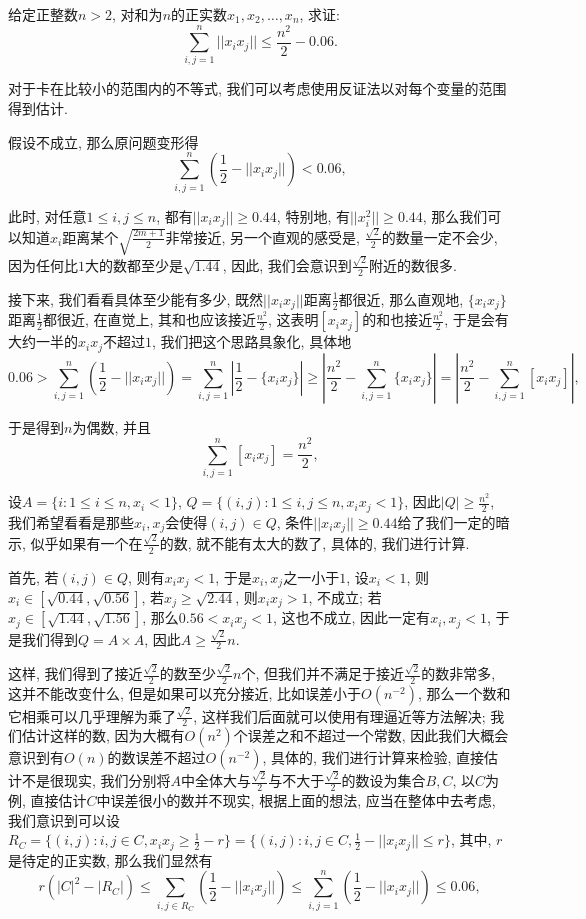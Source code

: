 \documentclass[lang=cn,12pt,thmcnt=section]{elegantbook}
\begin{document}
\begin{example}
给定正整数$n>2$, 对和为$n$的正实数$x_1,x_2,\dots{},x_n$, 求证: 
\[
\sum_{i,j=1}^n ||x_ix_j||\le \frac{n^2}{2}-0.06.
\]
\end{example}

\begin{analysis}
对于卡在比较小的范围内的不等式, 我们可以考虑使用反证法以对每个变量的范围得到估计.

假设不成立, 那么原问题变形得
\[
\sum_{i,j=1}^n \left(\frac{1}{2}-||x_ix_j||\right)<0.06,
\]

此时, 对任意$1\le i,j\le n$, 都有$||x_ix_j||\ge 0.44$, 特别地, 有$||x_i^2||\ge 0.44$, 那么我们可以知道$x_i$距离某个$\sqrt{\frac{2m+1}{2}}$非常接近, 另一个直观的感受是, $\frac{\sqrt{2}}{2}$的数量一定不会少, 因为任何比$1$大的数都至少是$\sqrt{1.44}$, 因此, 我们会意识到$\frac{\sqrt{2}}{2}$附近的数很多. 

接下来, 我们看看具体至少能有多少, 既然$||x_ix_j||$距离$\frac{1}{2}$都很近, 那么直观地, $\{x_ix_j\}$距离$\frac{1}{2}$都很近, 在直觉上, 其和也应该接近$\frac{n^2}{2}$, 这表明$[x_ix_j]$的和也接近$\frac{n^2}{2}$, 于是会有大约一半的$x_ix_j$不超过$1$, 我们把这个思路具象化, 具体地
\[
0.06>\sum_{i,j=1}^n \left(\frac{1}{2}-||x_ix_j||\right)=\sum_{i,j=1}^n \left|\frac{1}{2}-\{x_ix_j\}\right|\ge \left|\frac{n^2}{2}-\sum_{i,j=1}^n\{x_ix_j\}\right|=\left|\frac{n^2}{2}-\sum_{i,j=1}^n[x_ix_j]\right|,
\]

于是得到$n$为偶数, 并且
\[
\sum_{i,j=1}^n[x_ix_j]=\frac{n^2}{2},
\]

设$A=\{i:1\le i\le n,x_i<1\}$, $Q=\{(i,j):1\le i,j\le n,x_ix_j<1\}$, 因此$|Q|\ge \frac{n^2}{2}$, 我们希望看看是那些$x_i,x_j$会使得$(i,j)\in Q$, 条件$||x_ix_j||\ge 0.44$给了我们一定的暗示, 似乎如果有一个在$\frac{\sqrt{2}}{2}$的数, 就不能有太大的数了, 具体的, 我们进行计算. 

首先, 若$(i,j)\in Q$, 则有$x_ix_j< 1$, 于是$x_i,x_j$之一小于$1$, 设$x_i<1$, 则$x_i\in [\sqrt{0.44},\sqrt{0.56}]$, 若$x_j\ge \sqrt{2.44}$, 则$x_ix_j>1$, 不成立; 若$x_j\in [\sqrt{1.44},\sqrt{1.56}]$, 那么$0.56<x_ix_j<1$, 这也不成立, 因此一定有$x_i,x_j<1$, 于是我们得到$Q=A\times A$, 因此$A\ge \frac{\sqrt{2}}{2}n$.

这样, 我们得到了接近$\frac{\sqrt{2}}{2}$的数至少$\frac{\sqrt{2}}{2}n$个, 但我们并不满足于接近$\frac{\sqrt{2}}{2}$的数非常多, 这并不能改变什么, 但是如果可以充分接近, 比如误差小于$O(n^{-2})$, 那么一个数和它相乘可以几乎理解为乘了$\frac{\sqrt{2}}{2}$, 这样我们后面就可以使用有理逼近等方法解决; 我们估计这样的数, 因为大概有$O(n^2)$个误差之和不超过一个常数, 因此我们大概会意识到有$O(n)$的数误差不超过$O(n^{-2})$, 具体的, 我们进行计算来检验, 直接估计不是很现实, 我们分别将$A$中全体大与$\frac{\sqrt{2}}{2}$与不大于$\frac{\sqrt{2}}{2}$的数设为集合$B,C$, 以$C$为例, 直接估计$C$中误差很小的数并不现实, 根据上面的想法, 应当在整体中去考虑, 我们意识到可以设$R_C=\{(i,j):i,j\in C,x_ix_j\ge \frac{1}{2}-r\}=\{(i,j):i,j\in C,\frac{1}{2}-||x_ix_j||\le r\}$, 其中, $r$是待定的正实数, 那么我们显然有
\[
r(|C|^2-|R_C|)\le \sum_{i,j\in R_C} \left(\frac{1}{2}-||x_ix_j||\right)\le \sum_{i,j=1}^n \left(\frac{1}{2}-||x_ix_j||\right)\le 0.06,
\]


\end{analysis}
\end{document}
